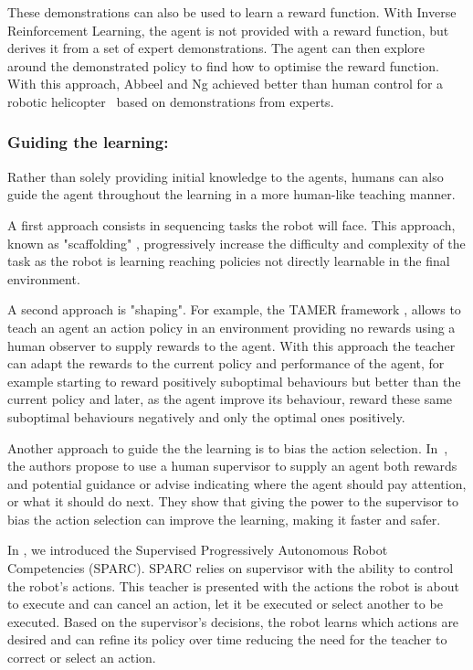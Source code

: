 \documentclass[letterpaper]{article} %
\begin{document}
These demonstrations can also be used to learn a reward function. With Inverse
Reinforcement Learning, the agent is not provided with a reward function, but
derives it from a set of expert demonstrations. The agent can then explore
around the demonstrated policy to find how to optimise the reward function. With
this approach, Abbeel and Ng achieved better than human control for a robotic
helicopter~\cite{abbeel2004apprenticeship} based on demonstrations from experts.

\subsubsection{Guiding the learning:}
Rather than solely providing initial knowledge
to the agents, humans can also guide the agent throughout the learning in a more
human-like teaching manner. 

A first approach consists in sequencing tasks the robot will face. 
This approach, known as "scaffolding" \cite{saunders2006teaching}, progressively
increase the difficulty and complexity of the task as the robot is learning
reaching policies not directly learnable in the final environment.

A second approach is "shaping". For example, the TAMER framework
\cite{knox2009interactively}, allows to teach an agent an action policy in an
environment providing no rewards using a human observer to supply rewards to the
agent. With this approach the teacher can adapt the
rewards to the current policy and performance of the agent, for example starting to reward
positively suboptimal behaviours but better than the current policy and
later, as the agent improve its behaviour, reward these same suboptimal
behaviours negatively and only the optimal ones positively.

Another approach to guide the the learning is to bias the action selection.
In~\cite{thomaz2008teachable}, the authors propose to use a human supervisor to
supply  an agent both rewards and potential guidance or advise indicating where
the agent should pay attention, or what it should do next. They show that
giving the power to the supervisor to bias the action selection can improve the
learning, making it faster and safer.

In \cite{senft2015sparc}, we introduced the Supervised Progressively
Autonomous Robot Competencies (SPARC). SPARC relies on supervisor with the
ability to control the robot's actions. This teacher is presented with the
actions the robot is about to execute and can cancel an action, let it be
executed or select another to be executed. Based on the supervisor's decisions,
the robot learns which actions are desired and can refine its policy over time
reducing the need for the teacher to correct or select an action.
\end{document}
